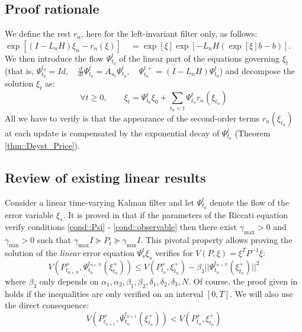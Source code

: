 \documentclass[a4paper,12pt,onecolumn]{article}
\begin{document}
\subsection{Proof rationale}
We define the rest $r_n$, here for the left-invariant filter only, as follows: $\exp \left[ (I-L_n H) \xi_n - r_n(\xi) \right]$    ~~= $\exp \left[ \xi \right] \exp \left[ -L_n H (\exp [ \xi] b - b) \right]$. We then introduce the flow $\Psi_{t_0}^t$ of the linear part  of the equations governing $\xi_t$ (that is, $
\Psi_{t_0}^{t_0} = Id , \quad 
\frac{d}{dt} \Psi_{t_0}^t = A_{u_t} \Psi_{t_0}^t ,\quad
\Psi_{t_0}^{t+} = (I-L_nH)\Psi_{t_0}^t$) and decompose the solution $\xi_t$ as:
\begin{equation}
\forall t\geq 0,\qquad\xi_t = \Psi_{t_0}^t \xi_0 + \sum_{t_n<t}\Psi_{t_n}^t r_n(\xi_{t_n}) \label{eq::decomposition}
\end{equation}
All we have to verify is that the appearance of the second-order terms $r_n(\xi_{t_n}) $ at each update is compensated by the exponential decay of $\Psi_{t_0}^t$ (Theorem \ref{thm::Deyst_Price}).
\subsection{Review of existing linear results}

Consider a linear time-varying Kalman filter and let $\Psi_{t_0}^t$ denote the flow of the error variable $\xi_s$. It is proved in \cite{deyst} that if the parameters of the Riccati equation verify conditions \eqref{cond::Psi} - \eqref{cond::observable} then there exist $\gamma_{\max}>0$ and $\gamma_{\min} >0$ such that $\gamma_{\max} I \succeq P_t \succeq \gamma_{\min} I$. This pivotal property allows proving the solution of the \emph{linear} error equation $\Psi_s^t \xi_s$ verifies for $V(P,\xi)=\xi^T P^{-1} \xi$:
\begin{equation}
V \left( P_{t_{n+N}}^+,\Psi_{t_n}^{t_{n+N}}(\xi_{t_n}^+) \right) \leq V(P_{t_{n}}^+,\xi_{t_n}^+) - \beta_3 ||\Psi_{t_n}^{t_{n+N}}(\xi_{t_n}^+)||^2 \label{eq::V_decreases_exponentially}
\end{equation}
where $\beta_3$ only depends on $\alpha_1,\alpha_2,\beta_1,\beta_2,\delta_1,\delta_2,\delta_3,N$. Of course, the proof given in \cite{deyst} holds if the inequalities are only verified on an interval $[0,T]$. We will also use the  direct consequence:
\begin{equation}
V \left( P_{t_{n+1}}^+,\Psi_{t_n}^{t_{n+1}}(\xi_{t_n}^+) \right) < V \left( P_{t_n}^+,\xi_{t_n}^+ \right) \label{eq::V_decreases}
\end{equation}
\end{document}
